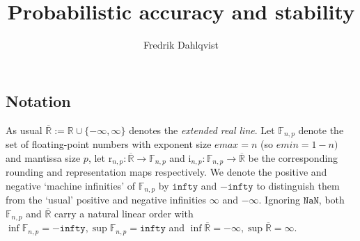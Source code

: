 \documentclass[10pt,a4paper]{article}
\author{Fredrik Dahlqvist}
\title{Probabilistic accuracy and stability}
\theoremstyle{plain}
\theoremstyle{definition}
\newcommand{\F}[1][n,p]{\mathbb{F}_{#1}}
\newcommand{\R}{\mathbb{R}}
\newcommand{\eR}{\overline{\R}}
\newcommand{\Rep}[1][n,p]{\mathrm{i}_{#1}}
\newcommand{\Round}[1][n,p]{\mathrm{r}_{#1}}
\newcommand{\NaN}{\mathtt{NaN}}
\newcommand{\minfty}{\mathtt{infty}}
\begin{document}
\maketitle




\subsection*{Notation}
As usual $\eR:=\R\cup\{-\infty,\infty\}$ denotes the \emph{extended real line}. 
Let $\F$ denote the set of floating-point numbers with exponent size $emax=n$ (so $emin=1-n)$ and mantissa size $p$, let $\Round:\eR\to\F$ and $\Rep: \F\to \eR$ be the corresponding rounding and representation maps respectively. We denote the positive and negative `machine infinities' of $\F$ by $\minfty$ and $-\minfty$ to distinguish them from the `usual' positive and negative infinities $\infty$ and $-\infty$. Ignoring $\NaN$, both $\F$ and $\eR$ carry a natural linear order with $\inf \F=-\minfty,\sup\F=\minfty$ and $\inf \eR=-\infty,\sup\eR=\infty$.
\end{document}
